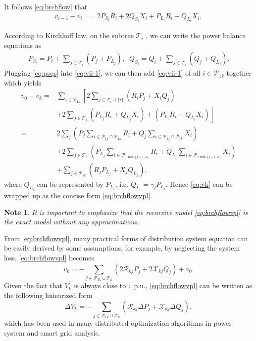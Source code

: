 \documentclass{article}
\newtheorem{note}{Note}[section]
\begin{document}
It follows \eqref{eq:brchflow} that
\begin{align}
v_{i-1}-v_{i}  &=2P_{S_i}R_i+2 Q_{S_i}X_i+P_{L_i}R_i+Q_{L_i}X_i,\label{eq:vii-1}
\end{align}

According to Kirchhoff law, on the subtree $\mathcal{T}_i$ , we can write the power balance equations as
\begin{align}
 P_{S_i} = P_i+\sum_{j\in \mathcal{T}_i}(P_{j}+P_{L_j}),\;\;
 Q_{S_i} = Q_i + \sum_{j\in \mathcal{T}_i}(Q_{j}+Q_{L_j}).\label{eq:psqs}
\end{align}
Plugging \eqref{eq:psqs} into \eqref{eq:vii-1}, we can then add \eqref{eq:vii-1} of all $i\in \mathcal{P}_{1k}$ together which yields
\begin{align}
v_{0}-v_{k}  =&\sum_{i\in \mathcal{P}_{1k}}\left[\right.2\sum_{j\in \mathcal{T}_i\cup\{i\}}(R_i P_j+ X_i Q_{j})\nonumber\\&+2\sum_{j\in \mathcal{T}_i}(P_{L_j} R_i+Q_{L_j}X_i)+(P_{L_i} R_i+Q_{L_i} X_i)\left.\right] \nonumber\\
=& 2\sum_{j}(P_j\sum_{i\in \mathcal{P}_{1j}\cap\mathcal{P}_{1k}}R_i+ Q_{j}\sum_{i\in \mathcal{P}_{1j}\cap\mathcal{P}_{1k}}X_i)\nonumber\\
&+2\sum_{j\in \mathcal{T}_1}(P_{L_j}\sum_{i\in\mathcal{P}_{1\min\{j-1,k\}} }R_i +Q_{L_j} \sum_{i\in\mathcal{P}_{1\min\{j-1,k\}} }X_i)\nonumber\\&+\sum_{j\in \mathcal{P}_{1k}}(R_jP_{L_j}+X_jQ_{L_j}),\label{eq:vk}
\end{align}
where $Q_{L_i}$ can be represented by $P_{L_i}$, i.e. $Q_{L_i}=\gamma_iP_{L_i}$. Hence \eqref{eq:vk} can be wrapped up as the concise form \eqref{eq:brchflowvpl}. 

\begin{note}
It is important to emphasize that the recursive model \eqref{eq:brchflowvpl} is the exact model without any approximations.  
\end{note}

From \eqref{eq:brchflowvpl}, many practical forms of distribution system equation can be easily derived by some assumptions, for example, by neglecting the system loss, \eqref{eq:brchflowvpl} becomes
\begin{equation}
    v_k =-\sum_{j\in\mathcal {P}_{1k}\cup \mathcal{T}_k} (2\mathcal{R}_{kj}P_j+ 2\mathcal{X}_{kj}Q_j)+v_0.\label{eq:vkliniear2}
\end{equation}
Given the fact that $V_k$ is always close to $1$ p.u., \eqref{eq:brchflowvpl} can be written as the following liniearized form  
\begin{equation}
    \Delta V_k =-\sum_{j\in\mathcal {P}_{1k}\cup \mathcal{T}_k} (\mathcal{R}_{kj}\Delta P_j+ \mathcal{X}_{kj}\Delta Q_j),\label{eq:vkliniear}
\end{equation}
which has been used in many distributed optimization algorithms in power system and smart grid analysis. 
\end{document}
